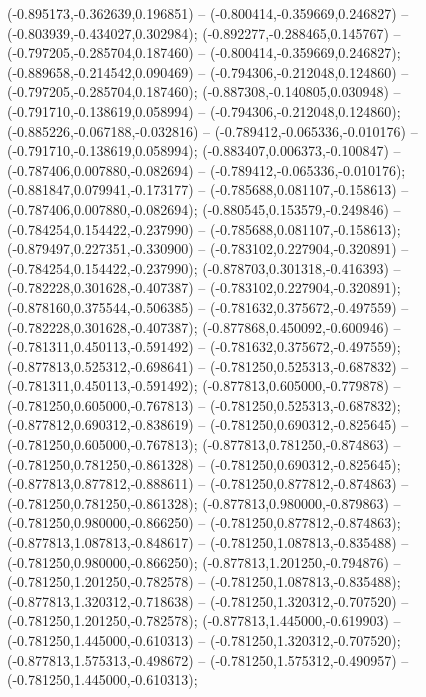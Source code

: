  (-0.895173,-0.362639,0.196851) -- (-0.800414,-0.359669,0.246827) -- (-0.803939,-0.434027,0.302984);
 (-0.892277,-0.288465,0.145767) -- (-0.797205,-0.285704,0.187460) -- (-0.800414,-0.359669,0.246827);
 (-0.889658,-0.214542,0.090469) -- (-0.794306,-0.212048,0.124860) -- (-0.797205,-0.285704,0.187460);
 (-0.887308,-0.140805,0.030948) -- (-0.791710,-0.138619,0.058994) -- (-0.794306,-0.212048,0.124860);
 (-0.885226,-0.067188,-0.032816) -- (-0.789412,-0.065336,-0.010176) -- (-0.791710,-0.138619,0.058994);
 (-0.883407,0.006373,-0.100847) -- (-0.787406,0.007880,-0.082694) -- (-0.789412,-0.065336,-0.010176);
 (-0.881847,0.079941,-0.173177) -- (-0.785688,0.081107,-0.158613) -- (-0.787406,0.007880,-0.082694);
 (-0.880545,0.153579,-0.249846) -- (-0.784254,0.154422,-0.237990) -- (-0.785688,0.081107,-0.158613);
 (-0.879497,0.227351,-0.330900) -- (-0.783102,0.227904,-0.320891) -- (-0.784254,0.154422,-0.237990);
 (-0.878703,0.301318,-0.416393) -- (-0.782228,0.301628,-0.407387) -- (-0.783102,0.227904,-0.320891);
 (-0.878160,0.375544,-0.506385) -- (-0.781632,0.375672,-0.497559) -- (-0.782228,0.301628,-0.407387);
 (-0.877868,0.450092,-0.600946) -- (-0.781311,0.450113,-0.591492) -- (-0.781632,0.375672,-0.497559);
 (-0.877813,0.525312,-0.698641) -- (-0.781250,0.525313,-0.687832) -- (-0.781311,0.450113,-0.591492);
 (-0.877813,0.605000,-0.779878) -- (-0.781250,0.605000,-0.767813) -- (-0.781250,0.525313,-0.687832);
 (-0.877812,0.690312,-0.838619) -- (-0.781250,0.690312,-0.825645) -- (-0.781250,0.605000,-0.767813);
 (-0.877813,0.781250,-0.874863) -- (-0.781250,0.781250,-0.861328) -- (-0.781250,0.690312,-0.825645);
 (-0.877813,0.877812,-0.888611) -- (-0.781250,0.877812,-0.874863) -- (-0.781250,0.781250,-0.861328);
 (-0.877813,0.980000,-0.879863) -- (-0.781250,0.980000,-0.866250) -- (-0.781250,0.877812,-0.874863);
 (-0.877813,1.087813,-0.848617) -- (-0.781250,1.087813,-0.835488) -- (-0.781250,0.980000,-0.866250);
 (-0.877813,1.201250,-0.794876) -- (-0.781250,1.201250,-0.782578) -- (-0.781250,1.087813,-0.835488);
 (-0.877813,1.320312,-0.718638) -- (-0.781250,1.320312,-0.707520) -- (-0.781250,1.201250,-0.782578);
 (-0.877813,1.445000,-0.619903) -- (-0.781250,1.445000,-0.610313) -- (-0.781250,1.320312,-0.707520);
 (-0.877813,1.575313,-0.498672) -- (-0.781250,1.575312,-0.490957) -- (-0.781250,1.445000,-0.610313);
